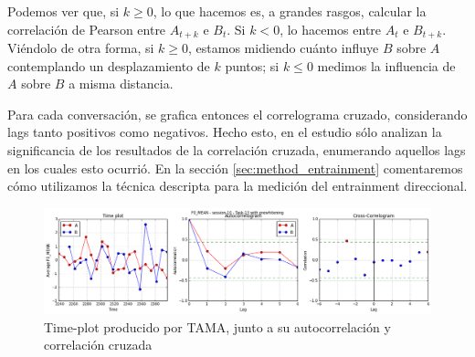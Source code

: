Podemos ver que, si $k \geq 0$, lo que hacemos es, a grandes rasgos, calcular la correlación de Pearson entre $A_{t+k}$ e $B_t$. Si $k < 0$, lo hacemos entre $A_t$ e $B_{t+k}$. Viéndolo de otra forma, si $k \geq 0$, estamos midiendo cuánto influye $B$ sobre $A$ contemplando un desplazamiento de $k$ puntos; si $k \leq 0$ medimos la influencia de $A$ sobre $B$ a misma distancia.


Para cada conversación, se grafica entonces el correlograma cruzado, considerando lags tanto positivos como negativos. Hecho esto, en el estudio \cite{KOU2008.2} sólo analizan la significancia de los resultados de la correlación cruzada, enumerando aquellos lags en los cuales esto ocurrió. En la sección \ref{sec:method_entrainment} comentaremos cómo utilizamos la técnica descripta para la medición del entrainment direccional.



\begin{figure}
\centering
\includegraphics[width=15cm]{images/time_plot_with_cross_correlation.png}
\caption{Time-plot producido por TAMA, junto a su autocorrelación y correlación cruzada}
\end{figure}
